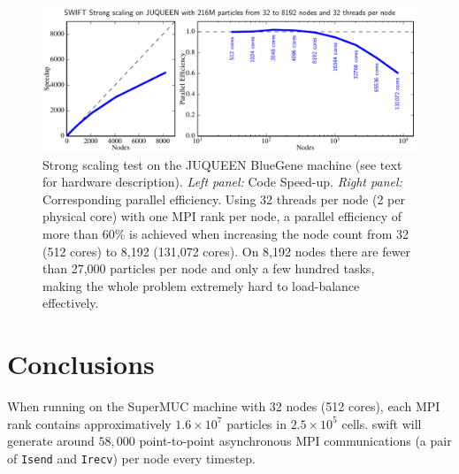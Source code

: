 \documentclass{sig-alternate-05-2015}
\newcommand{\swift}{{\sc swift}\xspace}
\begin{document}
\begin{figure}[t]
\centering
\includegraphics[width=\textwidth]{Figures/scalingBlueGene}
\caption{Strong scaling test on the JUQUEEN BlueGene machine (see text
  for hardware description). \textit{Left panel:} Code
  Speed-up. \textit{Right panel:} Corresponding parallel efficiency.
  Using 32 threads per node (2 per physical core) with one MPI rank
  per node, a parallel efficiency of more than $60\%$ is achieved when
  increasing the node count from 32 (512 cores) to 8,192 (131,072
  cores). On 8,192 nodes there are fewer than 27,000 particles per
  node and only a few hundred tasks, making the whole problem
  extremely hard to load-balance effectively.
  \label{fig:JUQUEEN2}}
\end{figure}






\section{Conclusions}

When running on the SuperMUC machine with 32 nodes (512 cores), each MPI rank
contains approximatively $1.6\times10^7$ particles in $2.5\times10^5$
cells. \swift will generate around $58,000$ point-to-point asynchronous MPI
communications (a pair of \texttt{Isend} and \texttt{Irecv}) per node every
timestep. 


\end{document}
